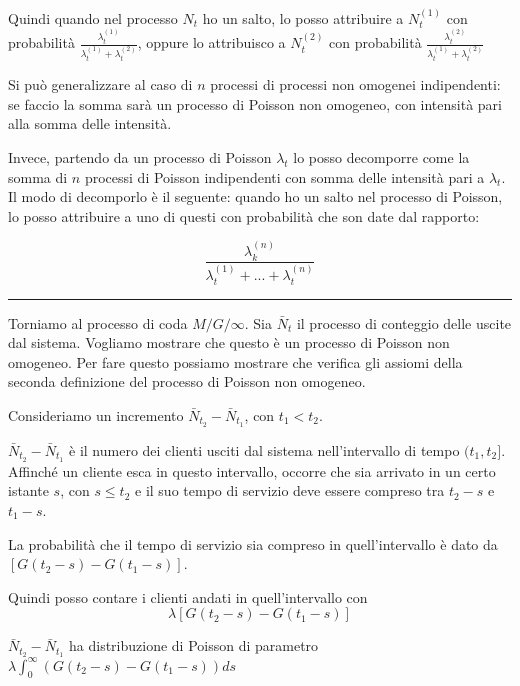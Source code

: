 \documentclass[a4paper,12pt]{book}
\begin{document}
Quindi quando nel processo $ N_t $ ho un salto, lo posso attribuire a $ N_t^{(1)} $ con probabilità $\frac{\lambda_t^{(1)}}{\lambda_t^{(1)} + \lambda_t^{(2)}}$, oppure lo attribuisco a $ N_t^{(2)} $ con probabilità $\frac{\lambda_t^{(2)}}{\lambda_t^{(1)} + \lambda_t^{(2)}}$


Si può generalizzare al caso di $ n $ processi di processi non omogenei indipendenti: se faccio la somma sarà un processo di Poisson non omogeneo, con intensità pari alla somma delle intensità. 

Invece, partendo da un processo di Poisson $ \lambda_t $ lo posso decomporre come la somma di $ n $ processi di Poisson indipendenti con somma delle intensità pari a $\lambda_t$. Il modo di decomporlo è il seguente: quando ho un salto nel processo di Poisson, lo posso attribuire a uno di questi con probabilità che son date dal rapporto:

$$ \frac{\lambda_k^{(n)}}{\lambda_t^{(1)} + ... + \lambda_t^{(n)}} $$

\vspace{1cm}
\hrule
\vspace{1cm}

Torniamo al processo di coda $ M/G/\infty $. Sia $ \bar{N}_t $ il processo di conteggio delle uscite dal sistema. Vogliamo mostrare che questo è un processo di Poisson non omogeneo. Per fare questo possiamo mostrare che verifica gli assiomi della seconda definizione del processo di Poisson non omogeneo.

Consideriamo un incremento $ \bar{N}_{t_2} - \bar{N}_{t_1} $, con $ t_1 < t_2 $.

$ \bar{N}_{t_2} - \bar{N}_{t_1} $ è il numero dei clienti usciti dal sistema nell'intervallo di tempo $ (t_1, t_2] $. Affinché un cliente esca in questo intervallo, occorre che sia arrivato in un certo istante $ s $, con $ s \le t_2 $ e il suo tempo di servizio deve essere compreso tra $ t_2 - s $ e $ t_1 - s $.

La probabilità che il tempo di servizio sia compreso in quell'intervallo è dato da $ [G(t_2 - s) - G(t_1 - s)] $.

Quindi posso contare i clienti andati in quell'intervallo con 
$$ \lambda[G(t_2 - s) - G(t_1 - s)] $$ 

$ \bar{N}_{t_2} - \bar{N}_{t_1} $ ha distribuzione di Poisson di parametro $\lambda \int_{0}^{\infty} (G(t_2 - s) - G(t_1 - s)) d s$
\end{document}

